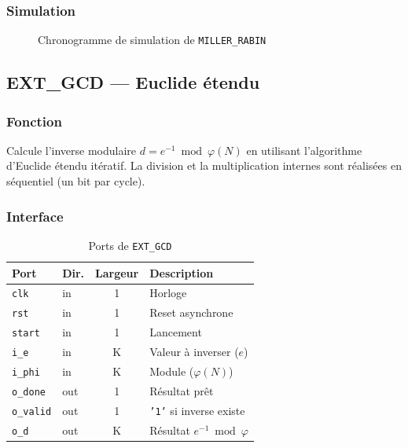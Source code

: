 \subsubsection{Simulation}
\begin{figure}[H]
\centering
{}
\caption{Chronogramme de simulation de \texttt{MILLER\_RABIN}}
\label{fig:sim_mr}
\end{figure}

\subsection{EXT\_GCD --- Euclide étendu}
\label{sec:gcd}

\subsubsection{Fonction}
Calcule l'inverse modulaire $d = e^{-1} \bmod \varphi(N)$ en utilisant
l'algorithme d'Euclide étendu itératif. La division et la multiplication
internes sont réalisées en séquentiel (un bit par cycle).

\subsubsection{Interface}
\begin{table}[H]
\centering
\caption{Ports de \texttt{EXT\_GCD}}
\begin{tabular}{llcp{5cm}}
\toprule
\textbf{Port} & \textbf{Dir.} & \textbf{Largeur} & \textbf{Description} \\
\midrule
\texttt{clk}     & in  & 1 & Horloge \\
\texttt{rst}     & in  & 1 & Reset asynchrone \\
\texttt{start}   & in  & 1 & Lancement \\
\texttt{i\_e}    & in  & K & Valeur à inverser ($e$) \\
\texttt{i\_phi}  & in  & K & Module ($\varphi(N)$) \\
\texttt{o\_done}  & out & 1 & Résultat prêt \\
\texttt{o\_valid} & out & 1 & \texttt{'1'} si inverse existe \\
\texttt{o\_d}     & out & K & Résultat $e^{-1} \bmod \varphi$ \\
\bottomrule
\end{tabular}
\end{table}


